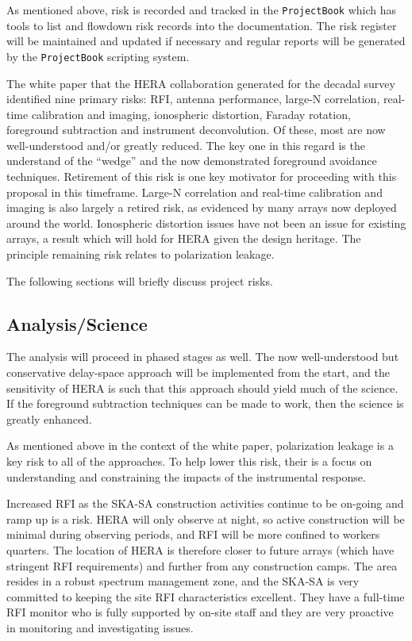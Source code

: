 \documentclass[preprint]{aastex}
\begin{document}
As mentioned above, risk is recorded and tracked in the {\tt ProjectBook} which has tools 
to list and flowdown risk records into the documentation.  The risk register will be 
maintained and updated if necessary and regular reports will be generated by the
{\tt ProjectBook} scripting system.

The white paper that the HERA collaboration generated for the decadal survey identified nine
primary risks:  RFI, antenna performance, large-N correlation, real-time calibration and imaging, 
ionospheric distortion, Faraday rotation, foreground subtraction and instrument deconvolution.
Of these, most are now well-understood and/or greatly reduced.  The key one in this regard is
the understand of the ``wedge'' and the now demonstrated foreground avoidance techniques.
Retirement of this risk is one key motivator for proceeding with this proposal in this
timeframe.  Large-N correlation and real-time calibration and imaging is also largely a
retired risk, as evidenced by many arrays now deployed around the world.  Ionospheric
distortion issues have not been an issue for existing arrays, a result which will hold for
HERA given the design heritage.  The principle remaining risk relates to polarization leakage.

The following sections will briefly discuss project risks.

\subsection{Analysis/Science}
The analysis will proceed in phased stages as well.  The now well-understood but 
conservative delay-space approach will be implemented from the start, and the sensitivity of
HERA is such that this approach should yield much of the science.  If the foreground
subtraction techniques can be made to work, then the science is greatly enhanced.

As mentioned above in the context of the white paper, polarization leakage is a key
risk to all of the approaches.  To help lower this risk, their is a focus on understanding and
constraining the impacts of the instrumental response.

Increased RFI as the SKA-SA construction activities continue to be on-going and 
ramp up is a risk.  HERA will only observe at night, so active construction will be
minimal during observing periods, and RFI will be more confined to workers quarters.
The location of HERA is therefore closer to future arrays (which have stringent
RFI requirements) and further from any construction camps.  The area resides in
a robust spectrum management zone, and the SKA-SA is very committed to
keeping the site RFI characteristics excellent.  They have a full-time RFI monitor
who is fully supported by on-site staff and they are very proactive in monitoring
and investigating issues.
\end{document}
